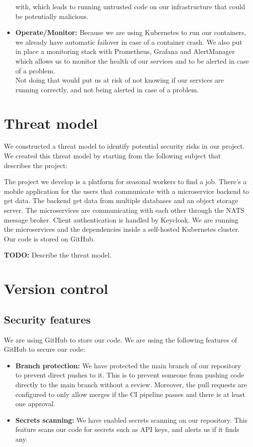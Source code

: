 \documentclass[12pt,x11names]{article}
\begin{document}
\begin{itemize}
    with, which leads to running untrusted code on our infrastructure that could be
    potentially malicious.
    \item \textbf{Operate/Monitor:} Because we are using Kubernetes to run our
    containers, we already have automatic failover in case of a container crash. We
    also put in place a monitoring stack with Prometheus, Grafana and AlertManager which
    allows us to monitor the health of our services and to be alerted in case of a problem.
    \medskip \\
    Not doing that would put us at risk of not knowing if our services are running
    correctly, and not being alerted in case of a problem.
\end{itemize}

\section{Threat model}

We constructed a threat model to identify potential security risks in our project. We 
created this threat model by starting from the following subject that describes the 
project:

\medskip
The project we develop is a platform for seasonal workers to find a job. There's a mobile 
application for the users that communicate with a microservice backend to get data. The 
backend get data from multiple databases and an object storage server. The microservices
are communicating with each other through the NATS message broker. Client authentication 
is handled by Keycloak. We are running the microservices and the dependencies inside a 
self-hosted Kubernetes cluster. Our code is stored on GitHub.

\medskip
\textbf{TODO:} Describe the threat model.

\section{Version control}

\subsection{Security features}

We are using GitHub to store our code. We are using the following features of GitHub to
secure our code:

\begin{itemize}
    \item \textbf{Branch protection:} We have protected the main branch of our repository
    to prevent direct pushes to it. This is to prevent someone from pushing code directly
    to the main branch without a review. Moreover, the pull requests are configured to
    only allow merges if the CI pipeline passes and there is at least one approval.
    \item \textbf{Secrets scanning:} We have enabled secrets scanning on our repository.
    This feature scans our code for secrets such as API keys, and alerts us if it finds
    any.
\end{itemize}
\end{document}
